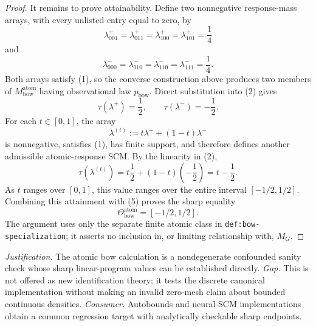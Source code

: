 \documentclass{article}
\begin{document}
\begin{proof}
It remains to prove attainability.  Define two nonnegative response-mass arrays, with every unlisted entry equal to zero, by
\[
  \lambda^+_{001}=\lambda^+_{011}
  =\lambda^+_{100}=\lambda^+_{101}=\frac14
\]
and
\[
  \lambda^-_{000}=\lambda^-_{010}
  =\lambda^-_{110}=\lambda^-_{111}=\frac14.
\]
Both arrays satisfy (1), so the converse construction above produces two members of \(M_{\mathrm{bow}}^{\mathrm{atom}}\) having observational law \(p_{\mathrm{bow}}\).  Direct substitution into (2) gives
\[
  \tau(\lambda^+)=\frac12,
  \qquad
  \tau(\lambda^-)=-\frac12.
  \tag{6}
\]
For each \(t\in[0,1]\), the array
\[
  \lambda^{(t)}:=t\lambda^+ +(1-t)\lambda^-
\]
is nonnegative, satisfies (1), has finite support, and therefore defines another admissible atomic-response SCM.  By the linearity in (2),
\[
  \tau(\lambda^{(t)})
  =t\frac12+(1-t)\left(-\frac12\right)
  =t-\frac12.
\]
As \(t\) ranges over \([0,1]\), this value ranges over the entire interval \([-1/2,1/2]\).  Combining this attainment with (5) proves the sharp equality
\[
  \Theta_{\mathrm{bow}}^{\mathrm{atom}}=[-1/2,1/2].
\]
The argument uses only the separate finite atomic class in \texttt{def:bow-specialization}; it asserts no inclusion in, or limiting relationship with, \(M_G\).
\end{proof}
\par\smallskip\noindent \textit{Justification.} The atomic bow calculation is a nondegenerate confounded sanity check whose sharp linear-program values can be established directly. \textit{Gap.} This is not offered as new identification theory; it tests the discrete canonical implementation without making an invalid zero-mesh claim about bounded continuous densities. \textit{Consumer.} Autobounds and neural-SCM implementations obtain a common regression target with analytically checkable sharp endpoints.
\end{document}
